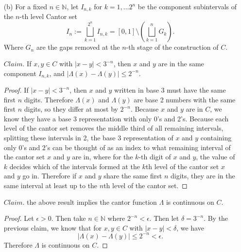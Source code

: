 \documentclass[12pt]{article}
\def\N{\mathbb{N}}
\begin{document}
\begin{itemize}
    \item[(b)] For a fixed $n \in \N$, let $I_{n,k}$ for $k = 1,\ldots 2^n$ be the component subintervals of the $n$-th level Cantor set $$I_n := \bigsqcup_{k=1}^{2^n} I_{n,k} = [0,1] \setminus \left( \bigsqcup_{k=1}^n G_k \right).$$ Where $G_n$ are the gaps removed at the $n$-th stage of the construction of $C$.
    
    $Claim.$ If $x, y \in C$ with $|x-y| < 3^{-n}$, then $x$ and $y$ are in the same component $I_{n,k}$, and $|\Lambda(x) - \Lambda(y)| \leq 2^{-n}.$

    \begin{proof}
        If $|x - y| < 3^{-n}$, then $x$ and $y$ written in base 3 must have the same first $n$ digits. Therefore $\Lambda (x)$ and $\Lambda (y)$ are base 2 numbers with the same first $n$ digits, so they differ at most by $2^{-n}$. Because $x$ and $y$ are in $C$, we know they have a base 3 representation with only 0's and 2's. Because each level of the cantor set removes the middle third of all remaining intervals, splitting these intervals in 2, the base 3 representation of $x$ and $y$ containing only 0's and 2's can be thought of as an index to what remaining interval of the cantor set $x$ and $y$ are in, where for the $k$-th digit of $x$ and $y$, the value of $k$ decides which of the intervals formed at the $k$th level of the cantor set $x$ and $y$ go in. Therefore if $x$ and $y$ share the same first $n$ digits, they are in the same interval at least up to the $n$th level of the cantor set.
    \end{proof}

    $Claim.$ the above result implies the cantor function $\Lambda$ is continuous on $C$.

    \begin{proof}
        Let $\epsilon > 0$. Then take $n \in \N$ where $2^{-n} < \epsilon$. Then let $\delta = 3^{-n}$. By the previous claim, we know that for $x, y \in C$ with $|x - y| < \delta$, we have $$|\Lambda(x) - \Lambda(y)| \leq 2^{-n} < \epsilon.$$ Therefore $\Lambda$ is continuous on $C$.
    \end{proof}
\end{itemize}
\end{document}
